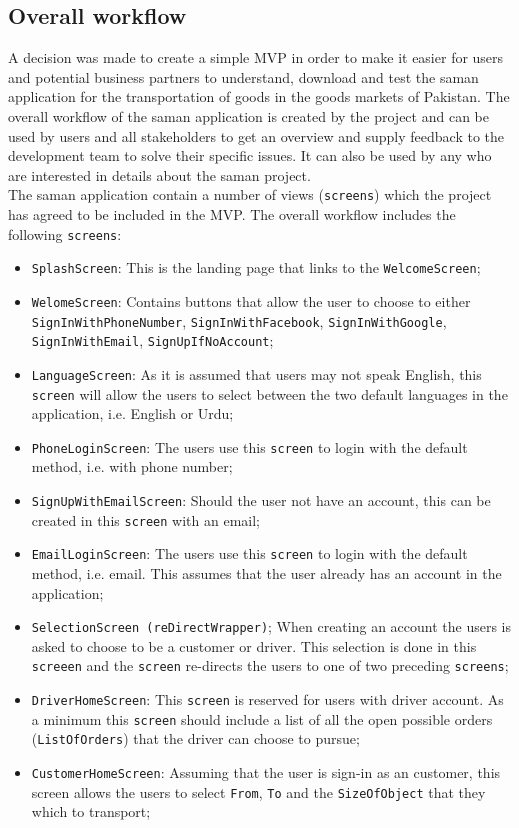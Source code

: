 \subsection{Overall workflow}
\label{subsec:overall_workflow}

\noindent A decision was made to create a simple MVP in order to make it easier for users and potential business partners to understand, download and test the saman application for the  transportation of goods in the goods markets of Pakistan. The overall workflow of the saman application is created by the project and can be used by users and all stakeholders to get an overview and supply feedback to the development team to solve their specific issues. It can also be used by any who are interested in details about the saman project.\\

\noindent The saman application contain a number of views (\texttt{screens}) which the project has agreed to be included in the MVP. The overall workflow includes the following \texttt{screens}:
\begin{itemize}
    \item \texttt{SplashScreen}: This is the landing page that links to the \texttt{WelcomeScreen};
    \item \texttt{WelomeScreen}: Contains buttons that allow the user to choose to either \texttt{SignInWithPhoneNumber}, \texttt{SignInWithFacebook}, \texttt{SignInWithGoogle}, \texttt{SignInWithEmail}, \texttt{SignUpIfNoAccount};
    \item \texttt{LanguageScreen}: As it is assumed that users may not speak English, this \texttt{screen} will allow the users to select between the two default languages in the application, i.e. English or Urdu;
    \item \texttt{PhoneLoginScreen}: The users use this \texttt{screen} to login with the default method, i.e. with phone number;
    \item \texttt{SignUpWithEmailScreen}: Should the user not have an account, this can be created in this \texttt{screen} with an email; 
    \item \texttt{EmailLoginScreen}: The users use this \texttt{screen} to login with the default method, i.e. email. This assumes that the user already has an account in the application;
    \item \texttt{SelectionScreen (reDirectWrapper)}; When creating an account the users is asked to choose to be a customer or driver. This selection is done in this \texttt{screeen} and the \texttt{screen} re-directs the users to one of two preceding \texttt{screens};
    \item \texttt{DriverHomeScreen}: This \texttt{screen} is reserved for users with driver account. As a minimum this \texttt{screen} should include a list of all the open possible orders (\texttt{ListOfOrders}) that the driver can choose to pursue; 
    \item \texttt{CustomerHomeScreen}: Assuming that the user is sign-in as an customer, this screen allows the users to select \texttt{From}, \texttt{To} and the \texttt{SizeOfObject} that they which to transport; 
\end{itemize}

